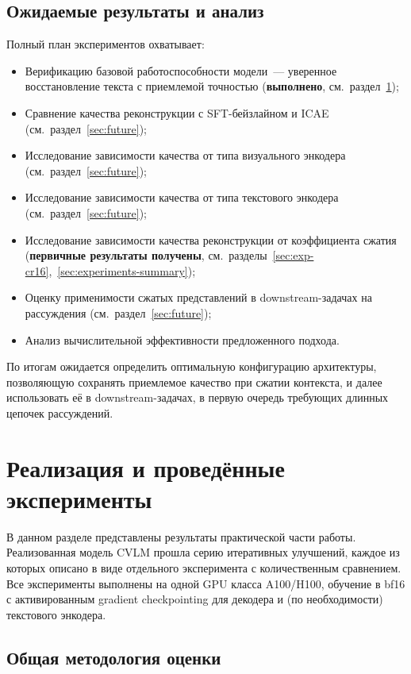 \documentclass[a4paper,12pt]{extarticle}
\begin{document}
\subsection{Ожидаемые результаты и анализ}

Полный план экспериментов охватывает:

\begin{itemize}
    \item Верификацию базовой работоспособности модели~--- уверенное восстановление текста с приемлемой точностью (\textbf{выполнено}, см.~раздел~\ref{sec:experiments});
    \item Сравнение качества реконструкции с SFT-бейзлайном и ICAE (см.~раздел~\ref{sec:future});
    \item Исследование зависимости качества от типа визуального энкодера (см.~раздел~\ref{sec:future});
    \item Исследование зависимости качества от типа текстового энкодера (см.~раздел~\ref{sec:future});
    \item Исследование зависимости качества реконструкции от коэффициента сжатия (\textbf{первичные результаты получены}, см.~разделы~\ref{sec:exp-cr16},~\ref{sec:experiments-summary});
    \item Оценку применимости сжатых представлений в downstream-задачах на рассуждения (см.~раздел~\ref{sec:future});
    \item Анализ вычислительной эффективности предложенного подхода.
\end{itemize}

По итогам ожидается определить оптимальную конфигурацию архитектуры, позволяющую сохранять приемлемое качество при сжатии контекста, и далее использовать её в downstream-задачах, в первую очередь требующих длинных цепочек рассуждений.

\section{Реализация и проведённые эксперименты}\label{sec:experiments}

В данном разделе представлены результаты практической части работы. Реализованная модель CVLM прошла серию итеративных улучшений, каждое из которых описано в виде отдельного эксперимента с количественным сравнением. Все эксперименты выполнены на одной GPU класса A100/H100, обучение в bf16 с активированным gradient checkpointing для декодера и (по необходимости) текстового энкодера.

\subsection{Общая методология оценки}\label{sec:eval-methodology}
\end{document}
